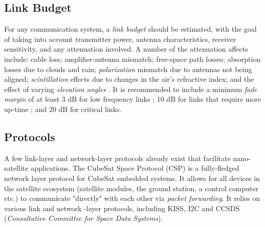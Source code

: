 \subsection{Link Budget}\label{sec:link_budget}
For any communication system, a \textit{link budget} should be estimated, with the goal of taking into account transmitter power, antenna characteristics, receiver sensitivity, and any attenuation involved. A number of the attenuation affects include: cable loss; amplifier-antenna mismatch; free-space path losses; absorption losses due to clouds and rain; \textit{polarization} mismatch due to antennas not being aligned; \textit{scintillation} effects due to changes in the air's refractive index; and the effect of varying \textit{elevation angles} \cite{design-satelliteLinkBudget}. It is recommended to include a minimum \textit{fade margin} of at least 3 dB for low frequency links \cite{paper-linkMargin}; 10 dB for links that require more up-time \cite{design-linkBudgetDesign}; and 20 dB for critical links.

\subsection{Protocols}
A few link-layer and network-layer protocols already exist that facilitate nano-satellite applications. 
The CubeSat Space Protocol (CSP) \cite{standard-csp} is a fully-fledged network layer protocol for CubeSat embedded systems. It allows for all devices in the satellite ecosystem (satellite modules, the ground station, a control computer etc.) to communicate "directly" with each other via \textit{packet forwarding}. It relies on various link and network -layer protocols, including KISS, I2C and CCSDS (\textit{Consultative Committee for Space Data Systems}).